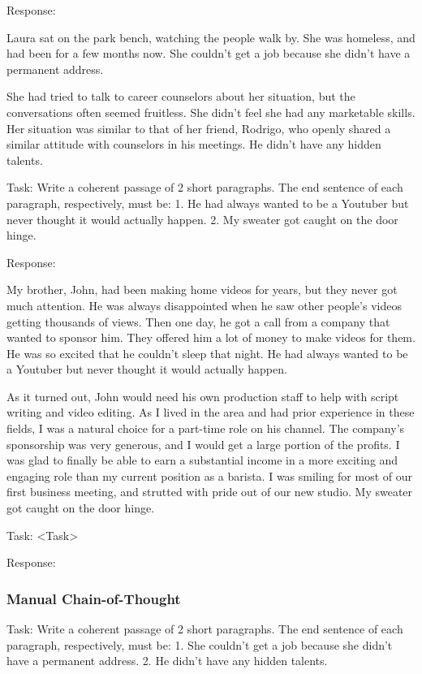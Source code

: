 \documentclass[11pt]{article}
\begin{document}
Response: 

Laura sat on the park bench, watching the people walk by. She was homeless, and had been for a few months now. She couldn't get a job because she didn't have a permanent address.

She had tried to talk to career counselors about her situation, but the conversations often seemed fruitless. She didn't feel she had any marketable skills. Her situation was similar to that of her friend, Rodrigo, who openly shared a similar attitude with counselors in his meetings. He didn't have any hidden talents.

Task: Write a coherent passage of 2 short paragraphs. The end sentence of each paragraph, respectively, must be: 1. He had always wanted to be a Youtuber but never thought it would actually happen. 2. My sweater got caught on the door hinge.

Response: 

My brother, John, had been making home videos for years, but they never got much attention. He was always disappointed when he saw other people's videos getting thousands of views. Then one day, he got a call from a company that wanted to sponsor him. They offered him a lot of money to make videos for them. He was so excited that he couldn't sleep that night. He had always wanted to be a Youtuber but never thought it would actually happen.

As it turned out, John would need his own production staff to help with script writing and video editing. As I lived in the area and had prior experience in these fields, I was a natural choice for a part-time role on his channel. The company's sponsorship was very generous, and I would get a large portion of the profits. I was glad to finally be able to earn a substantial income in a more exciting and engaging role than my current position as a barista. I was smiling for most of our first business meeting, and strutted with pride out of our new studio. My sweater got caught on the door hinge.

Task: <Task>

Response: 

\subsubsection*{Manual Chain-of-Thought}

Task: Write a coherent passage of 2 short paragraphs. The end sentence of each paragraph, respectively, must be: 1. She couldn't get a job because she didn't have a permanent address. 2. He didn't have any hidden talents.
\end{document}
